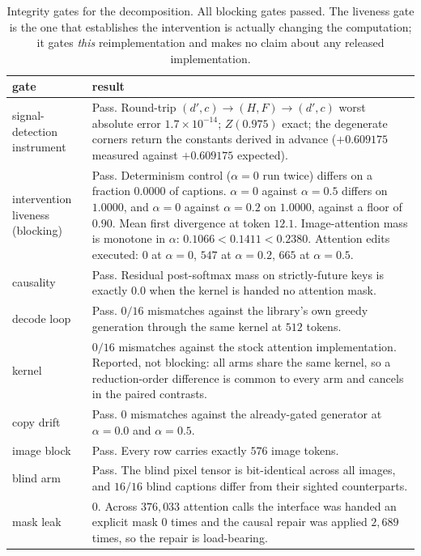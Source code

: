 \begin{table}[htb]
\caption{Integrity gates for the decomposition. All blocking gates passed. The liveness gate is the
one that establishes the intervention is actually changing the computation; it gates
\emph{this} reimplementation and makes no claim about any released implementation.}
\label{tab:mdgates}
\begin{center}
\small
\begin{tabular}{p{}p{}}
\toprule
gate & result \\
\midrule
signal-detection instrument & Pass. Round-trip $(d',c) \rightarrow (H,F) \rightarrow (d',c)$ worst
absolute error $1.7\times10^{-14}$; $Z(0.975)$ exact; the degenerate corners return the constants
derived in advance ($+0.609175$ measured against $+0.609175$ expected). \\
intervention liveness (blocking) & Pass. Determinism control ($\alpha = 0$ run twice) differs on a
fraction $0.0000$ of captions. $\alpha = 0$ against $\alpha = 0.5$ differs on $1.0000$, and
$\alpha = 0$ against $\alpha = 0.2$ on $1.0000$, against a floor of $0.90$. Mean first divergence at
token $12.1$. Image-attention mass is monotone in $\alpha$: $0.1066 < 0.1411 < 0.2380$. Attention
edits executed: $0$ at $\alpha = 0$, $547$ at $\alpha = 0.2$, $665$ at $\alpha = 0.5$. \\
causality & Pass. Residual post-softmax mass on strictly-future keys is exactly $0.0$ when the
kernel is handed no attention mask. \\
decode loop & Pass. $0/16$ mismatches against the library's own greedy generation through the same
kernel at $512$ tokens. \\
kernel & $0/16$ mismatches against the stock attention implementation. Reported, not blocking: all
arms share the same kernel, so a reduction-order difference is common to every arm and cancels in
the paired contrasts. \\
copy drift & Pass. $0$ mismatches against the already-gated generator at $\alpha = 0.0$ and
$\alpha = 0.5$. \\
image block & Pass. Every row carries exactly $576$ image tokens. \\
blind arm & Pass. The blind pixel tensor is bit-identical across all images, and $16/16$ blind
captions differ from their sighted counterparts. \\
mask leak & $0$. Across $376{,}033$ attention calls the interface was handed an explicit mask $0$
times and the causal repair was applied $2{,}689$ times, so the repair is load-bearing. \\
\bottomrule
\end{tabular}
\end{center}
\end{table}

